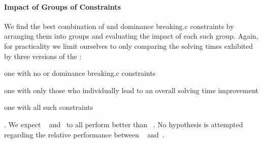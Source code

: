\paragraph{Impact of Groups of Constraints}

We find the best combination of  and
\gls{dominance breaking.c} \glspl{constraint} by arranging them into groups and
evaluating the impact of each such group.
%
Again, for practicality we limit ourselves to only comparing the solving times
exhibited by three versions of the :
%
\begin{modelList}
  \item {}
    one with no  or \gls{dominance breaking.c}
    \glspl{constraint}
  \item {}
    one with only those who individually lead to an overall solving time
    improvement
  \item {}
    one with all such \glspl{constraint}
\end{modelList}.
%
We expect ~
and~ to all perform better than ~.
%
No hypothesis is attempted regarding the relative performance between
~
and~.


